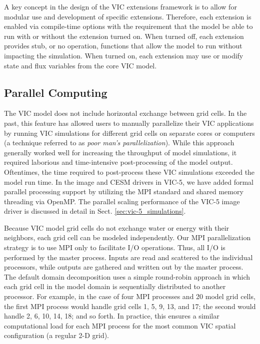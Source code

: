 \documentclass[gmd, manuscript]{copernicus}
\begin{document}
      A key concept in the design of the VIC extensions framework is to allow for modular use and development of specific extensions. Therefore, each extension is enabled via compile-time options with the requirement that the model be able to run with or without the extension turned on. When turned off, each extension provides stub, or no operation, functions that allow the model to run without impacting the simulation. When turned on, each extension may use or modify state and flux variables from the core VIC model.

  \subsection{Parallel Computing}
    \label{sec:parallel}
    The VIC model does not include horizontal exchange between grid cells. In the past, this feature has allowed users to manually parallelize their VIC applications by running VIC simulations for different grid cells on separate cores or computers (a technique referred to as \textit{poor man's parallelization}). While this approach generally worked well for increasing the throughput of model simulations, it required laborious and time-intensive post-processing of the model output. Oftentimes, the time required to post-process these VIC simulations exceeded the model run time. In the image and CESM drivers in VIC-5, we have added formal parallel processing support by utilizing the MPI standard and shared memory threading via OpenMP. The parallel scaling performance of the VIC-5 image driver is discussed in detail in Sect. \ref{sec:vic-5_simulations}.

    Because VIC model grid cells do not exchange water or energy with their neighbors, each grid cell can be modeled independently. Our MPI parallelization strategy is to use MPI only to facilitate I/O operations. Thus, all I/O is performed by the master process. Inputs are read and scattered to the individual processors, while outputs are gathered and written out by the master process. The default domain decomposition uses a simple round-robin approach in which each grid cell in the model domain is sequentially distributed to another processor. For example, in the case of four MPI processes and 20 model grid cells, the first MPI process would handle grid cells 1, 5, 9, 13, and 17; the second would handle 2, 6, 10, 14, 18; and so forth. In practice, this ensures a similar computational load for each MPI process for the most common VIC spatial configuration (a regular 2-D grid).
\end{document}
